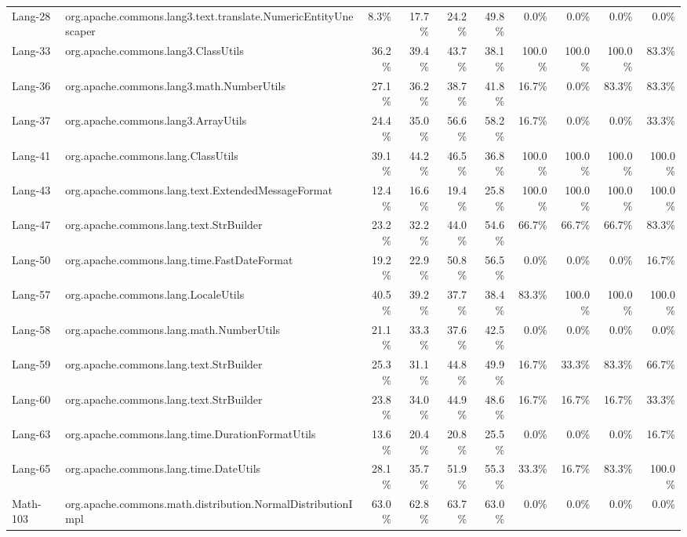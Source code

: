 \begin{tabular}{ ll rrrr rrrr}
Lang-28 &  org.apache.commons.lang3.text.translate.NumericEntityUnescaper &  8.3\% &  17.7\% &  24.2\% &  49.8\% &  0.0\% &  0.0\% &  0.0\% &  0.0\%\\ 
Lang-33 &  org.apache.commons.lang3.ClassUtils &  36.2\% &  39.4\% &  43.7\% &  38.1\% &  100.0\% &  100.0\% &  100.0\% &  83.3\%\\ 
Lang-36 &  org.apache.commons.lang3.math.NumberUtils &  27.1\% &  36.2\% &  38.7\% &  41.8\% &  16.7\% &  0.0\% &  83.3\% &  83.3\%\\ 
Lang-37 &  org.apache.commons.lang3.ArrayUtils &  24.4\% &  35.0\% &  56.6\% &  58.2\% &  16.7\% &  0.0\% &  0.0\% &  33.3\%\\ 
Lang-41 &  org.apache.commons.lang.ClassUtils &  39.1\% &  44.2\% &  46.5\% &  36.8\% &  100.0\% &  100.0\% &  100.0\% &  100.0\%\\ 
Lang-43 &  org.apache.commons.lang.text.ExtendedMessageFormat &  12.4\% &  16.6\% &  19.4\% &  25.8\% &  100.0\% &  100.0\% &  100.0\% &  100.0\%\\ 
Lang-47 &  org.apache.commons.lang.text.StrBuilder &  23.2\% &  32.2\% &  44.0\% &  54.6\% &  66.7\% &  66.7\% &  66.7\% &  83.3\%\\ 
Lang-50 &  org.apache.commons.lang.time.FastDateFormat &  19.2\% &  22.9\% &  50.8\% &  56.5\% &  0.0\% &  0.0\% &  0.0\% &  16.7\%\\ 
Lang-57 &  org.apache.commons.lang.LocaleUtils &  40.5\% &  39.2\% &  37.7\% &  38.4\% &  83.3\% &  100.0\% &  100.0\% &  100.0\%\\ 
Lang-58 &  org.apache.commons.lang.math.NumberUtils &  21.1\% &  33.3\% &  37.6\% &  42.5\% &  0.0\% &  0.0\% &  0.0\% &  0.0\%\\ 
Lang-59 &  org.apache.commons.lang.text.StrBuilder &  25.3\% &  31.1\% &  44.8\% &  49.9\% &  16.7\% &  33.3\% &  83.3\% &  66.7\%\\ 
Lang-60 &  org.apache.commons.lang.text.StrBuilder &  23.8\% &  34.0\% &  44.9\% &  48.6\% &  16.7\% &  16.7\% &  16.7\% &  33.3\%\\ 
Lang-63 &  org.apache.commons.lang.time.DurationFormatUtils &  13.6\% &  20.4\% &  20.8\% &  25.5\% &  0.0\% &  0.0\% &  0.0\% &  16.7\%\\ 
Lang-65 &  org.apache.commons.lang.time.DateUtils &  28.1\% &  35.7\% &  51.9\% &  55.3\% &  33.3\% &  16.7\% &  83.3\% &  100.0\%\\ 
Math-103 &  org.apache.commons.math.distribution.NormalDistributionImpl &  63.0\% &  62.8\% &  63.7\% &  63.0\% &  0.0\% &  0.0\% &  0.0\% &  0.0\%\\ 

\end{tabular}
